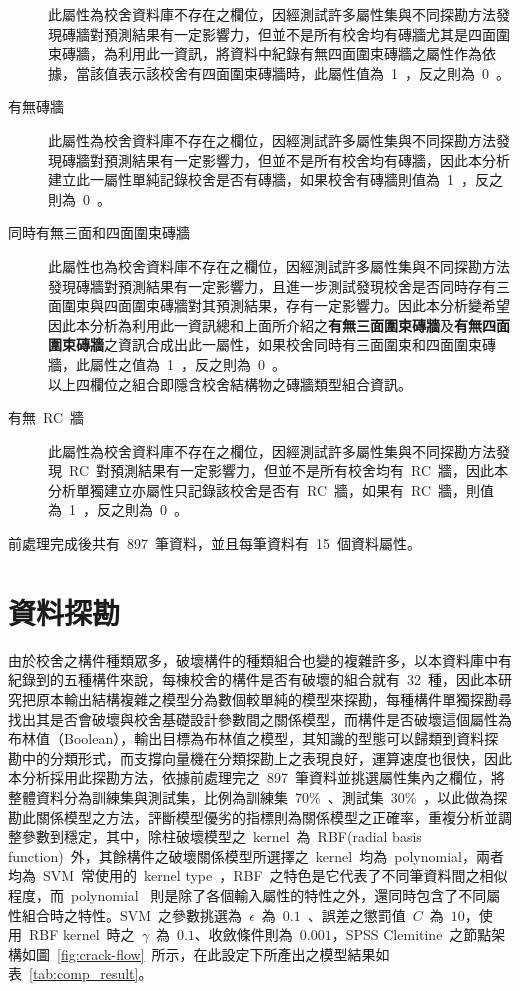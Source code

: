 \begin{description}
  此屬性為校舍資料庫不存在之欄位，因經測試許多屬性集與不同探勘方法發現磚牆對預測結果有一定影響力，但並不是所有校舍均有磚牆尤其是四面圍束磚牆，為利用此一資訊，將資料中紀錄有無四面圍束磚牆之屬性作為依據，當該值表示該校舍有四面圍束磚牆時，此屬性值為~1~，反之則為~0~。
  \item[有無磚牆]
  此屬性為校舍資料庫不存在之欄位，因經測試許多屬性集與不同探勘方法發現磚牆對預測結果有一定影響力，但並不是所有校舍均有磚牆，因此本分析建立此一屬性單純記錄校舍是否有磚牆，如果校舍有磚牆則值為~1~，反之則為~0~。
  \item[同時有無三面和四面圍束磚牆]
  此屬性也為校舍資料庫不存在之欄位，因經測試許多屬性集與不同探勘方法發現磚牆對預測結果有一定影響力，且進一步測試發現校舍是否同時存有三面圍束與四面圍束磚牆對其預測結果，存有一定影響力。因此本分析變希望因此本分析為利用此一資訊總和上面所介紹之\textbf{有無三面圍束磚牆}及\textbf{有無四面圍束磚牆}之資訊合成出此一屬性，如果校舍同時有三面圍束和四面圍束磚牆，此屬性之值為~1~，反之則為~0~。\\
  以上四欄位之組合即隱含校舍結構物之磚牆類型組合資訊。
  \item[有無~RC~牆]
  此屬性為校舍資料庫不存在之欄位，因經測試許多屬性集與不同探勘方法發現~RC~對預測結果有一定影響力，但並不是所有校舍均有~RC~牆，因此本分析單獨建立亦屬性只記錄該校舍是否有~RC~牆，如果有~RC~牆，則值為~1~，反之則為~0~。
\end{description}

前處理完成後共有~897~筆資料，並且每筆資料有~15~個資料屬性。

\section{資料探勘}

由於校舍之構件種類眾多，破壞構件的種類組合也變的複雜許多，以本資料庫中有紀錄到的五種構件來說，每棟校舍的構件是否有破壞的組合就有~32~種，因此本研究把原本輸出結構複雜之模型分為數個較單純的模型來探勘，每種構件單獨探勘尋找出其是否會破壞與校舍基礎設計參數間之關係模型，而構件是否破壞這個屬性為布林值（Boolean），輸出目標為布林值之模型，其知識的型態可以歸類到資料探勘中的分類形式，而支撐向量機在分類探勘上之表現良好，運算速度也很快，因此本分析採用此探勘方法，依據前處理完之~897~筆資料並挑選屬性集內之欄位，將整體資料分為訓練集與測試集，比例為訓練集~70\%~、測試集~30\%~，以此做為探勘此關係模型之方法，評斷模型優劣的指標則為關係模型之正確率，重複分析並調整參數到穩定，其中，除柱破壞模型之~kernel~為~RBF(radial basis function)~外，其餘構件之破壞關係模型所選擇之~kernel~均為~polynomial，兩者均為~SVM~常使用的~kernel type~，RBF~之特色是它代表了不同筆資料間之相似程度，而~polynomial
~則是除了各個輸入屬性的特性之外，還同時包含了不同屬性組合時之特性。SVM~之參數挑選為~$\epsilon$~為~$0.1$~、誤差之懲罰值~$C$~為~$10$，使用~RBF kernel~時之~$\gamma$~為~$0.1$、收斂條件則為~$0.001$，SPSS Clemitine~之節點架構如圖~\ref{fig:crack-flow}~所示，在此設定下所產出之模型結果如表~\ref{tab:comp_result}。


